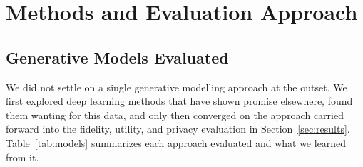 \documentclass[webpdf,contemporary,large]{oup-authoring-template}%
\theoremstyle{thmstyleone}%
\theoremstyle{thmstyletwo}%
\theoremstyle{thmstylethree}%
\begin{document}

\section{Methods and Evaluation Approach}
\label{sec:methods}

\subsection{Generative Models Evaluated}

We did not settle on a single generative modelling approach at the outset. We first explored deep learning methods that have shown promise elsewhere, found them wanting for this data, and only then converged on the approach carried forward into the fidelity, utility, and privacy evaluation in Section~\ref{sec:results}. Table~\ref{tab:models} summarizes each approach evaluated and what we learned from it.
\end{document}
